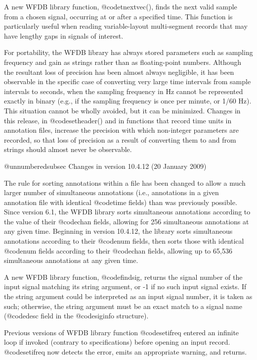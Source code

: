 {{{{{{{{A new WFDB library function, @code{tnextvec()}, finds the next valid sample
from a chosen signal, occurring at or after a specified time.  This
function is particularly useful when reading variable-layout
multi-segment records that may have lengthy gaps in signals of interest.

For portability, the WFDB library has always stored parameters such as
sampling frequency and gain as strings rather than as floating-point
numbers.  Although the resultant loss of precision has been almost
always negligible, it has been observable in the specific case of
converting very large time intervals from sample intervals to seconds,
when the sampling frequency in Hz cannot be represented exactly in
binary (e.g., if the sampling frequency is once per minute, or 1/60
Hz).  This situation cannot be wholly avoided, but it can be
minimized.  Changes in this release, in @code{setheader()} and in functions
that record time units in annotation files, increase the precision
with which non-integer parameters are recorded, so that loss of
precision as a result of converting them to and from strings should
almost never be observable.

@unnumberedsubsec Changes in version 10.4.12 (20 January 2009)

The rule for sorting annotations within a file has been changed to allow a much
larger number of simultaneous annotations (i.e., annotations in a given
annotation file with identical @code{time} fields) than was previously
possible.  Since version 6.1, the WFDB library sorts simultaneous annotations
according to the value of their @code{chan} fields, allowing for 256
simultaneous annotations at any given time.  Beginning in version 10.4.12, the
library sorts simultaneous annotations according to their @code{num} fields,
then sorts those with identical @code{num} fields according to their
@code{chan} fields, allowing up to 65,536 simultaneous annotations at any given
time.

A new WFDB library function, @code{findsig}, returns the signal number of the
input signal matching its string argument, or -1 if no such input signal
exists.  If the string argument could be interpreted as an input signal number,
it is taken as such; otherwise, the string argument must be an exact match to a
signal name (@code{desc} field in the @code{siginfo} structure).

Previous versions of WFDB library function @code{setifreq} entered an infinite
loop if invoked (contrary to specifications) before opening an input record.
@code{setifreq} now detects the error, emits an appropriate warning, and
returns.

}}}}}}}}
